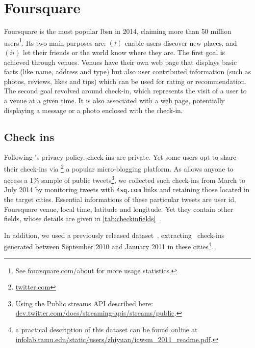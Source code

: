 \section{Foursquare}
\label{sec:foursquare}

Foursquare is the most popular \gls{lbsn} in 2014, claiming more than 50
million users\footnote{See \href{https://foursquare.com/about/}%
{\url{foursquare.com/about}} for more usage statistics.}. Its two main purposes
are: $(i)$ enable users discover new places, and $(ii)$ let their friends or the world know
where they are. The first goal is achieved through venues. Venues have their
own web page that displays basic facts (like name, address and type) but also
user contributed information (such as photos, reviews, likes and tips) which
can be used for rating or recommendation. The second goal revolved
around check-in, which represents the visit of a user to a venue at a given
time. It is also associated with a web page, potentially displaying a message
or a photo enclosed with the check-in.

\subsection{Check ins}

Following \fs's privacy policy, check-ins are private.  Yet some users opt to
share their check-ins via \tw\footnote{\href{https://twitter.com/}%
{\url{twitter.com}}} a popular micro-blogging platform. 
As \tw{} allows anyone to access a 1\% sample of public tweets\footnote{Using
the Public streams API described here:
\href{https://dev.twitter.com/docs/streaming-apis/streams/public}%
{\url{dev.twitter.com/docs/streaming-apis/streams/public}}.},
we collected such check-ins
from March to July 2014 by monitoring tweets with
\texttt{4sq.com} links and retaining those located in the target cities.
Essential informations of these  particular tweets are user id, Foursquare venue,
local time, latitude and longitude. Yet they contain other fields, whose
details are given in \autoref{tab:checkinfields}~.

In addition, we used a previously released dataset~\autocite{dataset11},
extracting  \fs\ check-ins generated between September 2010
and January 2011 in these cities\footnote{a practical description of this
	dataset can be found online at
	\href{http://infolab.tamu.edu/static/users/zhiyuan/icwsm\_2011\_readme.pdf}%
{\url{infolab.tamu.edu/static/users/zhiyuan/icwsm_2011_readme.pdf}}.}.

